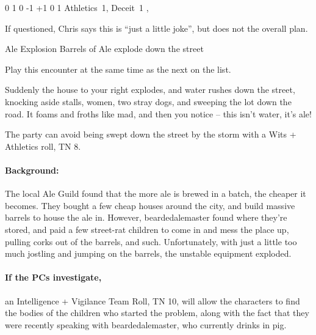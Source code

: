 \begin{multicols}{2}

	{0}%
	{1}%
	{{0}%
	{-1}%
	{+1}}%
	{0}%
	{1}%
	{Athletics~1, Deceit~1}%
	{\longsword, \completeplate}%
	{\addtocounter{xpbonus}{-3}}

If questioned, Chris says this is ``just a little joke'', but does not the overall plan.

{Ale Explosion}%
{Barrels of Ale explode down the street}%

Play this encounter at the same time as the next on the list.

\begin{boxtext}

	Suddenly the house to your right explodes, and water rushes down the street, knocking aside stalls, women, two stray dogs, and sweeping the lot down the road.  It foams and froths like mad, and then you notice -- this isn't water, it's ale!

\end{boxtext}

The party can avoid being swept down the street by the storm with a Wits + Athletics roll, TN 8.

\paragraph{Background:} The local Ale Guild found that the more ale is brewed in a batch, the cheaper it becomes.
They bought a few cheap houses around the city, and build massive barrels to house the ale in.
However, \gls{beardedalemaster} found where they're stored, and paid a few street-rat children to come in and mess the place up, pulling corks out of the barrels, and such.
Unfortunately, with just a little too much jostling and jumping on the barrels, the unstable equipment exploded.

\paragraph{If the PCs investigate,}
an Intelligence + Vigilance Team Roll, TN 10, will allow the characters to find the bodies of the children who started the problem, along with the fact that they were recently speaking with \gls{beardedalemaster}, who currently drinks in \gls{pig}.%
\iftoggle{core}%
{\footnote{See the core rules, page \pageref{teamwork}, for Team Rolls.}}%
{}%


\end{multicols}
